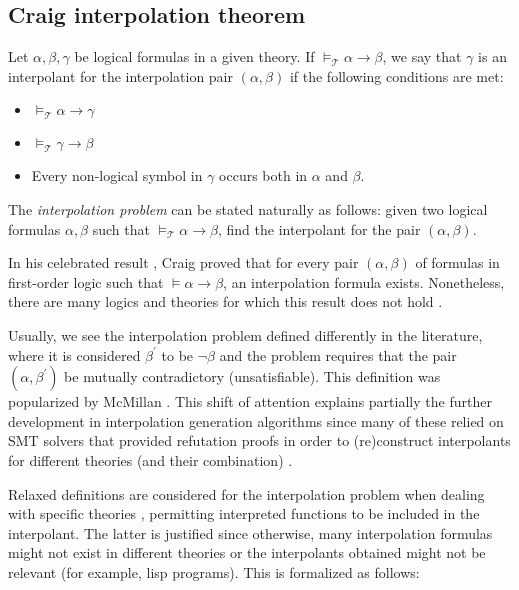 \subsection{Craig interpolation theorem}

Let $\alpha, \beta, \gamma$ be logical formulas in a given theory. If
$\models_{\mathcal{T}} \alpha \rightarrow \beta$, we say that $\gamma$ is an
interpolant for the interpolation pair $(\alpha, \beta)$ if the following conditions
are met:

\begin{itemize}
\item $\models_{\mathcal{T}} \alpha \rightarrow \gamma$
\item $\models_{\mathcal{T}} \gamma \rightarrow \beta$
\item Every non-logical symbol in $\gamma$ occurs both in $\alpha$ and
  $\beta$.
\end{itemize}

The \emph{interpolation problem} can be stated naturally as 
follows: given two logical formulas $\alpha, \beta$ such that 
$\models_{\mathcal{T}} \alpha \rightarrow \beta$, find
the interpolant for the pair $(\alpha, \beta)$.

In his celebrated result \cite{10.2307/2963594}, Craig proved that for every pair
$(\alpha, \beta)$ of formulas in first-order logic such that
$\models \alpha \rightarrow \beta$, an interpolation formula exists. Nonetheless,
there are many logics and theories for which this result does not hold \cite{komori1978}.

Usually, we see the interpolation problem defined differently in the literature, 
where it is considered $\beta^{'}$ to be $\neg \beta$ and 
the problem requires that the pair $(\alpha, \beta^{'})$
be mutually contradictory (unsatisfiable). This definition was popularized by 
McMillan \cite{10.1007/978-3-540-24730-2_2}. This shift of attention explains 
partially the further development in interpolation generation algorithms 
since many of these relied on SMT solvers that provided refutation proofs 
in order to (re)construct interpolants for different theories (and their 
combination) \cite{10.1007/978-3-642-02959-2_17, 
10.1007/978-3-642-36742-7_9, mcmillan2011interpolants}.

Relaxed definitions are considered for the interpolation 
problem when dealing with specific
theories \cite{10.1007/11532231_26}, permitting interpreted
functions to be included in the interpolant. The latter is 
justified since otherwise, many interpolation formulas might not exist
in different theories or the interpolants obtained might not 
be relevant (for example, lisp programs). This is formalized as follows:

